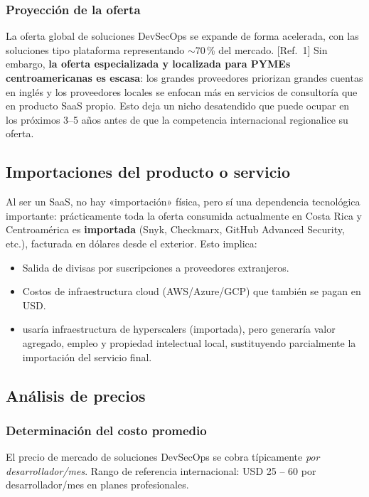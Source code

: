 \subsubsection{Proyección de la oferta}
La oferta global de soluciones DevSecOps se expande de forma acelerada, con las
soluciones tipo plataforma representando $\sim$70\,\% del mercado. [Ref.~1] Sin embargo,
\textbf{la oferta especializada y localizada para PYMEs centroamericanas es escasa}:
los grandes proveedores priorizan grandes cuentas en inglés y los proveedores locales
se enfocan más en servicios de consultoría que en producto SaaS propio. Esto deja un
nicho desatendido que \NombreProducto{} puede ocupar en los próximos 3--5 años antes
de que la competencia internacional regionalice su oferta.

\subsection{Importaciones del producto o servicio}
Al ser un SaaS, no hay «importación» física, pero sí una dependencia tecnológica
importante: prácticamente toda la oferta consumida actualmente en Costa Rica y
Centroamérica es \textbf{importada} (Snyk, Checkmarx, GitHub Advanced Security, etc.),
facturada en dólares desde el exterior. Esto implica:

\begin{itemize}
  \item Salida de divisas por suscripciones a proveedores extranjeros.
  \item Costos de infraestructura cloud (AWS/Azure/GCP) que también se pagan en USD.
  \item \NombreProducto{} usaría infraestructura de hyperscalers (importada), pero
        generaría valor agregado, empleo y propiedad intelectual local, sustituyendo
        parcialmente la importación del servicio final.
\end{itemize}

\subsection{Análisis de precios}

\subsubsection{Determinación del costo promedio}
El precio de mercado de soluciones DevSecOps se cobra típicamente \emph{por
desarrollador/mes}. Rango de referencia internacional: USD 25 -- 60 por
desarrollador/mes en planes profesionales.


